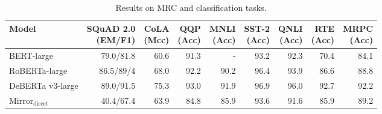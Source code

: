 \begin{table*}
  \centering

  \begin{tabular}{l|r|rrrrrrr}
    \toprule
    Model & \shortstack{SQuAD 2.0 \\ (EM/F1)} & \shortstack{CoLA \\ (Mcc)} & \shortstack{QQP \\ (Acc)} & \shortstack{MNLI \\ (Acc)} & \shortstack{SST-2 \\ (Acc)} & \shortstack{QNLI \\ (Acc)} & \shortstack{RTE \\ (Acc)} & \shortstack{MRPC \\ (Acc)} \\
    \midrule
    BERT-large         & 79.0/81.8         & 60.6       & 91.3      & -          & 93.2        & 92.3       & 70.4      & 84.1       \\
    RoBERTa-large      & 86.5/89/4         & 68.0       & 92.2      & 90.2       & 96.4        & 93.9       & 86.6      & 88.8       \\
    DeBERTa v3-large   & 89.0/91.5         & 75.3       & 93.0      & 91.9       & 96.9        & 96.0       & 92.7      & 92.2       \\
    Mirror$_{\text{direct}}$ & 40.4/67.4         & 63.9       & 84.8      & 85.9       & 93.6        & 91.6       & 85.9      & 89.2 \\
    \bottomrule
  \end{tabular}
  \caption{
    Results on MRC and classification tasks.
  }
  \label{tab:mrc-cls-results}
\end{table*}
